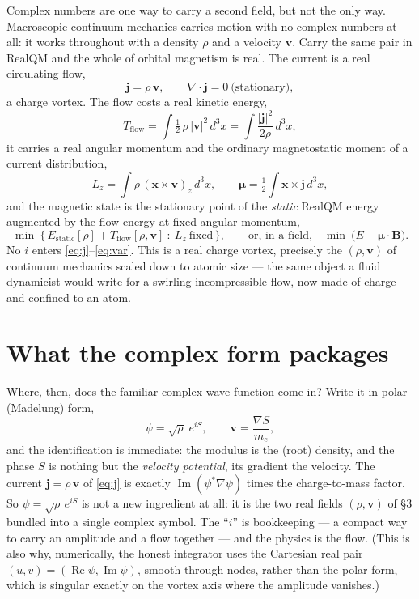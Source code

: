 \documentclass[11pt]{article}
\begin{document}
Complex numbers are one way to carry a second field, but not the only way. Macroscopic continuum mechanics
carries motion with no complex numbers at all: it works throughout with a density $\rho$ and a velocity
$\mathbf v$. Carry the same pair in RealQM and the whole of orbital magnetism is real. The current is a real
circulating flow,
\begin{equation}
\mathbf j=\rho\,\mathbf v,\qquad \nabla\!\cdot\!\mathbf j=0\ \text{(stationary)},
\label{eq:j}
\end{equation}
a charge vortex. The flow costs a real kinetic energy,
\begin{equation}
T_{\text{flow}}=\int \tfrac12\,\rho\,|\mathbf v|^2\,d^3x=\int \frac{|\mathbf j|^2}{2\rho}\,d^3x ,
\label{eq:T}
\end{equation}
it carries a real angular momentum and the ordinary magnetostatic moment of a current distribution,
\begin{equation}
L_z=\int \rho\,(\mathbf x\times\mathbf v)_z\,d^3x ,\qquad
\boldsymbol\mu=\tfrac12\int \mathbf x\times\mathbf j\,d^3x ,
\label{eq:muL}
\end{equation}
and the magnetic state is the stationary point of the \emph{static} RealQM energy augmented by the flow energy
at fixed angular momentum,
\begin{equation}
\min\ \big\{\,E_{\text{static}}[\rho]+T_{\text{flow}}[\rho,\mathbf v]\ :\ L_z\ \text{fixed}\,\big\},
\qquad\text{or, in a field,}\quad \min\ \big(E-\boldsymbol\mu\!\cdot\!\mathbf B\big).
\label{eq:var}
\end{equation}
No $i$ enters \eqref{eq:j}--\eqref{eq:var}. This is a real charge vortex, precisely the $(\rho,\mathbf v)$ of
continuum mechanics scaled down to atomic size --- the same object a fluid dynamicist would write for a
swirling incompressible flow, now made of charge and confined to an atom.

\section{What the complex form packages}

Where, then, does the familiar complex wave function come in? Write it in polar (Madelung) form,
\[
\psi=\sqrt{\rho}\;e^{iS},\qquad \mathbf v=\frac{\nabla S}{m_e},
\]
and the identification is immediate: the modulus is the (root) density, and the phase $S$ is nothing but the
\emph{velocity potential}, its gradient the velocity. The current $\mathbf j=\rho\,\mathbf v$ of \eqref{eq:j}
is exactly $\operatorname{Im}(\psi^*\nabla\psi)$ times the charge-to-mass factor. So $\psi=\sqrt\rho\,e^{iS}$
is not a new ingredient at all: it is the two real fields $(\rho,\mathbf v)$ of \S3 bundled into a single
complex symbol. The ``$i$'' is bookkeeping --- a compact way to carry an amplitude and a flow together --- and
the physics is the flow. (This is also why, numerically, the honest integrator uses the Cartesian real pair
$(u,v)=(\operatorname{Re}\psi,\operatorname{Im}\psi)$, smooth through nodes, rather than the polar form, which
is singular exactly on the vortex axis where the amplitude vanishes.)
\end{document}
